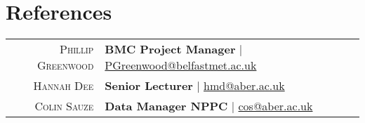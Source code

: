 \documentclass[a4paper,10pt]{article}
\begin{document}
\section{References}
\begin{tabular}{rl}	
  \textsc{Phillip Greenwood} & \textbf{BMC Project Manager} | \href{PGreenwood@belfastmet.ac.uk}{PGreenwood@belfastmet.ac.uk}
  \\
  \textsc{Hannah Dee} & \textbf{Senior Lecturer} | \href{hmd@aber.ac.uk}{hmd@aber.ac.uk}
  \\
  \textsc{Colin Sauze} & \textbf{Data Manager NPPC} | \href{cos@aber.ac.uk}{cos@aber.ac.uk}

                        

\end{tabular}



\end{document}
